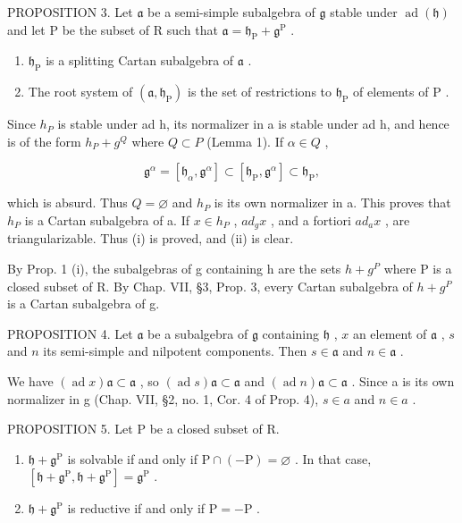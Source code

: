 PROPOSITION 3. Let \(\mathfrak{a}\) be a semi-simple subalgebra of \(\mathfrak{g}\) stable under \(\operatorname{ad}(\mathfrak{h})\) and let \(\mathrm{P}\) be the subset of \(\mathrm{R}\) such that \(\mathfrak{a} = \mathfrak{h}_{\mathrm{P}} + \mathfrak{g}^{\mathrm{P}}\) .

\begin{enumerate}
\def\labelenumi{(\roman{enumi})}
\item
  \(\mathfrak{h}_{\mathrm{P}}\) is a splitting Cartan subalgebra of \(\mathfrak{a}\) .
\item
  The root system of \((\mathfrak{a},\mathfrak{h}_{\mathrm{P}})\) is the set of restrictions to \(\mathfrak{h}_{\mathrm{P}}\) of elements of \(\mathrm{P}\) .
\end{enumerate}

Since \(h_{P}\) is stable under ad h, its normalizer in a is stable under ad h, and hence is of the form \(h_{P} + g^{Q}\) where \(Q \subset P\) (Lemma 1). If \(\alpha \in Q\) ,

\[
\mathfrak {g} ^ {\alpha} = \left[ \mathfrak {h} _ {\alpha}, \mathfrak {g} ^ {\alpha} \right] \subset \left[ \mathfrak {h} _ {\mathrm{P}}, \mathfrak {g} ^ {\alpha} \right] \subset \mathfrak {h} _ {\mathrm{P}},
\]

which is absurd. Thus \(Q = \varnothing\) and \(h_{P}\) is its own normalizer in a. This proves that \(h_{P}\) is a Cartan subalgebra of a. If \(x \in h_{P}\) , \(ad_{g}x\) , and a fortiori \(ad_{a}x\) , are triangularizable. Thus (i) is proved, and (ii) is clear.

By Prop. 1 (i), the subalgebras of g containing h are the sets \(h + g^{P}\) where P is a closed subset of R. By Chap. VII, §3, Prop. 3, every Cartan subalgebra of \(h + g^{P}\) is a Cartan subalgebra of g.

PROPOSITION 4. Let \(\mathfrak{a}\) be a subalgebra of \(\mathfrak{g}\) containing \(\mathfrak{h}\) , \(x\) an element of \(\mathfrak{a}\) , \(s\) and \(n\) its semi-simple and nilpotent components. Then \(s \in \mathfrak{a}\) and \(n \in \mathfrak{a}\) .

We have \((\operatorname{ad} x)\mathfrak{a} \subset \mathfrak{a}\) , so \((\operatorname{ad} s)\mathfrak{a} \subset \mathfrak{a}\) and \((\operatorname{ad} n)\mathfrak{a} \subset \mathfrak{a}\) . Since a is its own normalizer in g (Chap. VII, §2, no. 1, Cor. 4 of Prop. 4), \(s \in a\) and \(n \in a\) .

PROPOSITION 5. Let P be a closed subset of R.

\begin{enumerate}
\def\labelenumi{(\roman{enumi})}
\item
  \(\mathfrak{h} + \mathfrak{g}^{\mathrm{P}}\) is solvable if and only if \(\mathrm{P} \cap (-\mathrm{P}) = \varnothing\) . In that case, \([\mathfrak{h} + \mathfrak{g}^{\mathrm{P}}, \mathfrak{h} + \mathfrak{g}^{\mathrm{P}}] = \mathfrak{g}^{\mathrm{P}}\) .
\item
  \(\mathfrak{h} + \mathfrak{g}^{\mathrm{P}}\) is reductive if and only if \(\mathrm{P} = -\mathrm{P}\) .
\end{enumerate}

